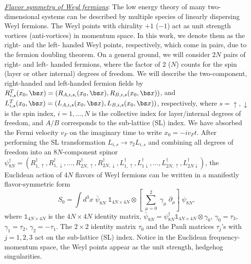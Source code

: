 \documentclass[aps,prb,amsmath,amssymb,floatfix,twocolumn]{revtex4}
\begin{document}
\underline{\emph{Flavor symmetry of Weyl fermions}}: The low energy theory of many two-dimensional systems can be described by multiple species of linearly dispersing Weyl fermions. The Weyl points with chirality $+1$ ($-1$) act as unit strength vortices (anti-vortices) in momentum space. In this work, we denote them as the right- and the left- handed Weyl points, respectively, which come in pairs, due to the fermion doubling theorem. On a general ground, we will consider $2N$ pairs of right- and left- handed fermions, where the factor of $2$ ($N$) counts for the spin (layer or other internal) degrees of freedom. We will describe the two-component, right-handed and left-handed fermion fields by $R^T_{i,s}(x_0,\bs x)=(R_{A,i,s,}(x_0,\bs x) , R_{B,i,s}(x_0,\bs x) )$, and $L^T_{i,s}(x_0,\bs x)=(L_{A,i,s}(x_0,\bs x) , L_{B,i,s}(x_0,\bs x) )$, respectively, where $s=\uparrow, \downarrow$ is the spin index, $i=1,...,N$ is the collective index for layer/internal degrees of freedom, and $A/B$ corresponds to the sub-lattice (SL) index. We have absorbed the Fermi velocity $v_F$ on the imaginary time to write $x_0= - i v_F t$. After performing the SL transformation $L_{i,s} \to \tau_2 L_{i,s} $ and combining all degrees of freedom into an $8N$-component spinor $\psi^\dagger_{8N}=(R^\dagger_{1,\uparrow}, R^\dagger_{1,\downarrow},...,R^\dagger_{2N,\uparrow}, R^\dagger_{2N,\downarrow},L^\dagger_{1,\uparrow}, L^\dagger_{1\downarrow},...,L^\dagger_{2N,\uparrow}, L^\dagger_{2N\downarrow}) $, the Euclidean action of $4N$ flavors of Weyl fermions can be written in a manifestly flavor-symmetric form 
\begin{equation}
S_0=\int d^3x \; \bar{\psi}_{8N} \; \mathbb{1}_{4N \times 4N}  \otimes  \left[ \; \sum_{\mu=0}^{2} \; \gamma_{\mu} \; \partial_\mu \right] \; \psi_{8N}, \label{eq1}
\end{equation}
where $\mathbb{1}_{4N \times 4N}$ is the $4N \times 4N$ identity matrix, $\bar{\psi}_{8N}=\psi^\dagger_{8N} \mathbb{1}_{4N \times 4N} \otimes \gamma_0$, $\gamma_0=\tau_3$, $\gamma_1=\tau_2$, $\gamma_2=-\tau_1$. The $2 \times 2$ identity matrix $\tau_0$ and the Pauli matrices $\tau_j$'s with $j=1,2,3$ act on the sub-lattice (SL) index. Notice in the Euclidean frequency-momentum space, the Weyl points appear as the unit strength, hedgehog singularities. \\
\end{document}

